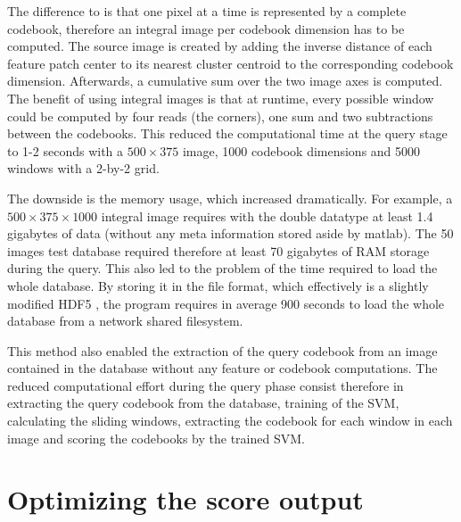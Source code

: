 The difference to \cite{viola2001rapid} is that one pixel at a time is represented by a complete codebook, therefore an integral image per codebook dimension has to be computed. The source image is created by adding the inverse distance of each feature patch center to its nearest cluster centroid to the corresponding codebook dimension. Afterwards, a cumulative sum over the two image axes is computed. The benefit of using integral images is that at runtime, every possible window could be computed by four reads (the corners), one sum and two subtractions between the codebooks. This reduced the computational time at the query stage to 1-2 seconds with a $500\times375$ image, 1000 codebook dimensions and 5000 windows with a 2-by-2 grid.

The downside is the memory usage, which increased dramatically. For example, a $500 \times 375 \times 1000$ integral image requires with the double datatype at least 1.4 gigabytes of data (without any meta information stored aside by matlab). The 50 images test database required therefore at least 70 gigabytes of RAM storage during the query. This also led to the problem of the time required to load the whole database. By storing it in the  file format, which effectively is a slightly modified HDF5 \cite{hdf5}, the program requires in average 900 seconds to load the whole database from a network shared filesystem.

This method also enabled the extraction of the query codebook from an image contained in the database without any feature or codebook computations. The reduced computational effort during the query phase consist therefore in extracting the query codebook from the database, training of the \ac{SVM}, calculating the sliding windows, extracting the codebook for each window in each image and scoring the codebooks by the trained \ac{SVM}.

\section{Optimizing the score output}


